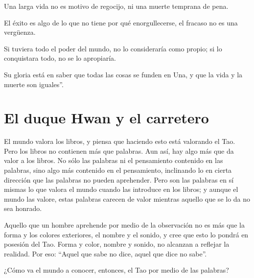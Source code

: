 \documentclass[book,b5paper,hidelinks,final]{memoir}
\begin{document}
	Una larga vida no es motivo de regocijo, ni una muerte temprana de pena.
	
	El éxito es algo de lo que no tiene por qué enorgullecerse, el fracaso
	no es una vergüenza.
	
	Si tuviera todo el poder del mundo, no lo consideraría como propio; si
	lo conquistara todo, no se lo apropiaría.
	
	Su gloria está en saber que todas las cosas se funden en Una, y que la
	vida y la muerte son iguales''.
	
	\chapter*{El duque Hwan y el carretero}
	
	El mundo valora los libros, y piensa que haciendo esto está valorando el
	Tao. Pero los libros no contienen más que palabras. Aun así, hay algo
	más que da valor a los libros. No sólo las palabras ni el pensamiento
	contenido en las palabras, sino algo más contenido en el pensamiento,
	inclinando lo en cierta dirección que las palabras no pueden aprehender.
	Pero son las palabras en sí mismas lo que valora el mundo cuando las
	introduce en los libros; y aunque el mundo las valore, estas palabras
	carecen de valor mientras aquello que se lo da no sea honrado.
	
	Aquello que un hombre aprehende por medio de la observación no es más
	que la forma y los colores exteriores, el nombre y el sonido, y cree que
	esto lo pondrá en posesión del Tao. Forma y color, nombre y sonido, no
	alcanzan a reflejar la realidad. Por eso: ``Aquel que sabe no dice,
	aquel que dice no sabe''.
	
	¿Cómo va el mundo a conocer, entonces, el Tao por medio de las palabras?
	
\end{document}
